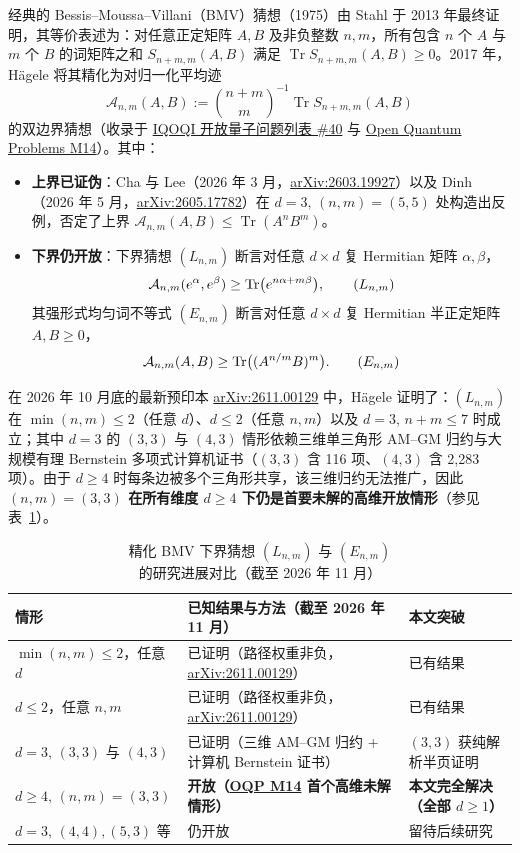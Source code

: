 \documentclass[11pt,a4paper]{article}
\theoremstyle{remark}
\newcommand{\Tr}{\operatorname{Tr}}
\begin{document}
经典的 Bessis--Moussa--Villani（BMV）猜想（1975）由 Stahl 于 2013 年最终证明，其等价表述为：对任意正定矩阵 $A,B$ 及非负整数 $n,m$，所有包含 $n$ 个 $A$ 与 $m$ 个 $B$ 的词矩阵之和 $S_{n+m,m}(A,B)$ 满足 $\Tr S_{n+m,m}(A,B) \ge 0$。2017 年，H\"agele 将其精化为对归一化平均迹
\[
\mathcal{A}_{n,m}(A,B) := \binom{n+m}{m}^{-1} \Tr S_{n+m,m}(A,B)
\]
的双边界猜想（收录于 \href{https://oqp.iqoqi.oeaw.ac.at/open-quantum-problems}{IQOQI 开放量子问题列表 \#40} 与 \href{https://openquantumproblems.com/p/M14}{Open Quantum Problems M14}）。其中：
\begin{itemize}
  \item \textbf{上界已证伪}：Cha 与 Lee（2026 年 3 月，\href{https://arxiv.org/abs/2603.19927}{arXiv:2603.19927}）以及 Dinh（2026 年 5 月，\href{https://arxiv.org/html/2605.17782v1}{arXiv:2605.17782}）在 $d=3,\,(n,m)=(5,5)$ 处构造出反例，否定了上界 $\mathcal{A}_{n,m}(A,B)\le \Tr(A^n B^m)$。
  \item \textbf{下界仍开放}：下界猜想 $(L_{n,m})$ 断言对任意 $d\times d$ 复 Hermitian 矩阵 $\alpha,\beta$，
  \[
  \mathcal{A}_{n,m}(e^\alpha, e^\beta) \ge \Tr\!\big(e^{n\alpha + m\beta}\big), \tag{$L_{n,m}$}
  \]
  其强形式均匀词不等式 $(E_{n,m})$ 断言对任意 $d\times d$ 复 Hermitian 半正定矩阵 $A,B\ge 0$，
  \[
  \mathcal{A}_{n,m}(A,B) \ge \Tr\!\big((A^{n/m}B)^m\big). \tag{$E_{n,m}$}
  \]
\end{itemize}

在 2026 年 10 月底的最新预印本 \href{https://arxiv.org/html/2611.00129v1}{arXiv:2611.00129} 中，H\"agele 证明了：$(L_{n,m})$ 在 $\min(n,m)\le 2$（任意 $d$）、$d\le 2$（任意 $n,m$）以及 $d=3,\, n+m\le 7$ 时成立；其中 $d=3$ 的 $(3,3)$ 与 $(4,3)$ 情形依赖三维单三角形 AM--GM 归约与大规模有理 Bernstein 多项式计算机证书（$(3,3)$ 含 116 项、$(4,3)$ 含 2,283 项）。由于 $d\ge 4$ 时每条边被多个三角形共享，该三维归约无法推广，因此 \textbf{$(n,m)=(3,3)$ 在所有维度 $d\ge 4$ 下仍是首要未解的高维开放情形}（参见表~\ref{tab:status}）。

\begin{table}[!htbp]
\centering
\caption{精化 BMV 下界猜想 $(L_{n,m})$ 与 $(E_{n,m})$ 的研究进展对比（截至 2026 年 11 月）}
\label{tab:status}
\begin{tabularx}{\linewidth}{lXl}
\toprule
情形 & 已知结果与方法（截至 2026 年 11 月） & 本文突破 \\
\midrule
$\min(n,m)\le 2$，任意 $d$ & 已证明（路径权重非负，\href{https://arxiv.org/html/2611.00129v1}{arXiv:2611.00129}） & 已有结果 \\
$d\le 2$，任意 $n,m$ & 已证明（路径权重非负，\href{https://arxiv.org/html/2611.00129v1}{arXiv:2611.00129}） & 已有结果 \\
$d=3,\,(3,3)$ 与 $(4,3)$ & 已证明（三维 AM--GM 归约 + 计算机 Bernstein 证书） & $(3,3)$ 获纯解析半页证明 \\
\textbf{$d\ge 4,\,(n,m)=(3,3)$} & \textbf{开放（\href{https://openquantumproblems.com/p/M14}{OQP M14} 首个高维未解情形）} & \textbf{本文完全解决（全部 $d\ge 1$）} \\
$d=3,\,(4,4),(5,3)$ 等 & 仍开放 & 留待后续研究 \\
\bottomrule
\end{tabularx}
\end{table}
\end{document}
